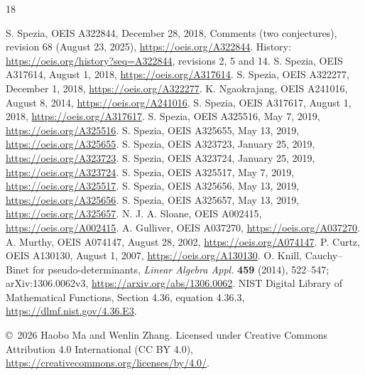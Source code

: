 \documentclass[11pt]{article}
\begin{document}
\begingroup\footnotesize
\begin{thebibliography}{18}
\raggedright
\setlength{\itemsep}{0pt}
 S. Spezia, OEIS A322844, December 28, 2018,
Comments (two conjectures), revision 68 (August 23, 2025),
\url{https://oeis.org/A322844}.
History: \url{https://oeis.org/history?seq=A322844}, revisions 2, 5 and 14.
 S. Spezia, OEIS A317614, August 1, 2018,
\url{https://oeis.org/A317614}.
 S. Spezia, OEIS A322277, December 1, 2018,
\url{https://oeis.org/A322277}.
 K. Ngaokrajang, OEIS A241016, August 8, 2014,
\url{https://oeis.org/A241016}.
 S. Spezia, OEIS A317617, August 1, 2018,
\url{https://oeis.org/A317617}.
 S. Spezia, OEIS A325516, May 7, 2019,
\url{https://oeis.org/A325516}.
 S. Spezia, OEIS A325655, May 13, 2019,
\url{https://oeis.org/A325655}.
 S. Spezia, OEIS A323723, January 25, 2019,
\url{https://oeis.org/A323723}.
 S. Spezia, OEIS A323724, January 25, 2019,
\url{https://oeis.org/A323724}.
 S. Spezia, OEIS A325517, May 7, 2019,
\url{https://oeis.org/A325517}.
 S. Spezia, OEIS A325656, May 13, 2019,
\url{https://oeis.org/A325656}.
 S. Spezia, OEIS A325657, May 13, 2019,
\url{https://oeis.org/A325657}.
 N. J. A. Sloane, OEIS A002415,
\url{https://oeis.org/A002415}.
 A. Gulliver, OEIS A037270,
\url{https://oeis.org/A037270}.
 A. Murthy, OEIS A074147, August 28, 2002,
\url{https://oeis.org/A074147}.
 P. Curtz, OEIS A130130, August 1, 2007,
\url{https://oeis.org/A130130}.
 O. Knill, Cauchy--Binet for pseudo-determinants,
\emph{Linear Algebra Appl.} \textbf{459} (2014), 522--547;
arXiv:1306.0062v3, \url{https://arxiv.org/abs/1306.0062}.
 NIST Digital Library of Mathematical Functions,
Section 4.36, equation 4.36.3,
\url{https://dlmf.nist.gov/4.36.E3}.
\end{thebibliography}
\endgroup
\noindent\small\copyright\ 2026 Haobo Ma and Wenlin Zhang.
Licensed under Creative Commons Attribution 4.0 International
(CC BY 4.0), \url{https://creativecommons.org/licenses/by/4.0/}.
\end{document}

